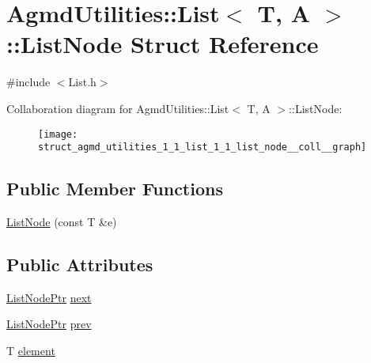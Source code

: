 \hypertarget{struct_agmd_utilities_1_1_list_1_1_list_node}{\section{Agmd\+Utilities\+:\+:List$<$ T, A $>$\+:\+:List\+Node Struct Reference}
\label{struct_agmd_utilities_1_1_list_1_1_list_node}
}


{\ttfamily \#include $<$List.\+h$>$}



Collaboration diagram for Agmd\+Utilities\+:\+:List$<$ T, A $>$\+:\+:List\+Node\+:\nopagebreak
\begin{figure}[H]
\begin{center}
\leavevmode
\texttt{[image: struct\_agmd\_utilities\_1\_1\_list\_1\_1\_list\_node\_\_coll\_\_graph]}
\end{center}
\end{figure}
\subsection*{Public Member Functions}
\begin{DoxyCompactItemize}
\item 
\hyperlink{struct_agmd_utilities_1_1_list_1_1_list_node_af0f4f45bdfdd3a0c0caa812a834284fb}{List\+Node} (const T \&e)
\end{DoxyCompactItemize}
\subsection*{Public Attributes}
\begin{DoxyCompactItemize}
\item 
\hyperlink{class_agmd_utilities_1_1_list_a41bf36081cbb28f08e4e4a9f6f45f4f6}{List\+Node\+Ptr} \hyperlink{struct_agmd_utilities_1_1_list_1_1_list_node_ac267accf962da56f1c76b7e2f88cca33}{next}
\item 
\hyperlink{class_agmd_utilities_1_1_list_a41bf36081cbb28f08e4e4a9f6f45f4f6}{List\+Node\+Ptr} \hyperlink{struct_agmd_utilities_1_1_list_1_1_list_node_aeca4057e42c540101b808c2c745a21f7}{prev}
\item 
T \hyperlink{struct_agmd_utilities_1_1_list_1_1_list_node_aec5ea78bee50e2a776753148e709353d}{element}
\end{DoxyCompactItemize}



